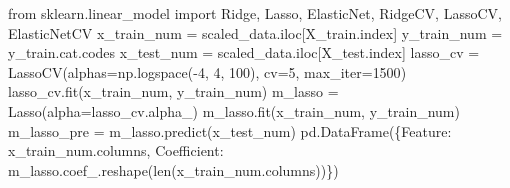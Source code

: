 \documentclass[
  11pt,
  letterpaper,
  DIV=11,
  numbers=noendperiod]{scrartcl}
\newenvironment{Shaded}{\begin{snugshade}}{\end{snugshade}}
\newcommand{\BuiltInTok}[1]{\textcolor[rgb]{0.00,0.23,0.31}{#1}}
\newcommand{\DecValTok}[1]{\textcolor[rgb]{0.68,0.00,0.00}{#1}}
\newcommand{\ImportTok}[1]{\textcolor[rgb]{0.00,0.46,0.62}{#1}}
\newcommand{\NormalTok}[1]{\textcolor[rgb]{0.00,0.23,0.31}{#1}}
\newcommand{\OperatorTok}[1]{\textcolor[rgb]{0.37,0.37,0.37}{#1}}
\newcommand{\StringTok}[1]{\textcolor[rgb]{0.13,0.47,0.30}{#1}}
\begin{document}
\begin{Shaded}
\begin{Highlighting}[]
\ImportTok{from}\NormalTok{ sklearn.linear\_model }\ImportTok{import}\NormalTok{ Ridge, Lasso, ElasticNet, RidgeCV, LassoCV, ElasticNetCV}
\NormalTok{x\_train\_num }\OperatorTok{=}\NormalTok{ scaled\_data.iloc[X\_train.index]}
\NormalTok{y\_train\_num }\OperatorTok{=}\NormalTok{ y\_train.cat.codes}
\NormalTok{x\_test\_num }\OperatorTok{=}\NormalTok{ scaled\_data.iloc[X\_test.index]}
\NormalTok{lasso\_cv }\OperatorTok{=}\NormalTok{ LassoCV(alphas}\OperatorTok{=}\NormalTok{np.logspace(}\OperatorTok{{-}}\DecValTok{4}\NormalTok{, }\DecValTok{4}\NormalTok{, }\DecValTok{100}\NormalTok{), cv}\OperatorTok{=}\DecValTok{5}\NormalTok{, max\_iter}\OperatorTok{=}\DecValTok{1500}\NormalTok{)}
\NormalTok{lasso\_cv.fit(x\_train\_num, y\_train\_num)}
\NormalTok{m\_lasso }\OperatorTok{=}\NormalTok{ Lasso(alpha}\OperatorTok{=}\NormalTok{lasso\_cv.alpha\_)}
\NormalTok{m\_lasso.fit(x\_train\_num, y\_train\_num) }
\NormalTok{m\_lasso\_pre }\OperatorTok{=}\NormalTok{ m\_lasso.predict(x\_test\_num)}
\NormalTok{pd.DataFrame(\{}\StringTok{\textquotesingle{}Feature\textquotesingle{}}\NormalTok{: x\_train\_num.columns, }\StringTok{\textquotesingle{}Coefficient\textquotesingle{}}\NormalTok{: m\_lasso.coef\_.reshape(}\BuiltInTok{len}\NormalTok{(x\_train\_num.columns))\})}
\end{Highlighting}
\end{Shaded}
\end{document}
